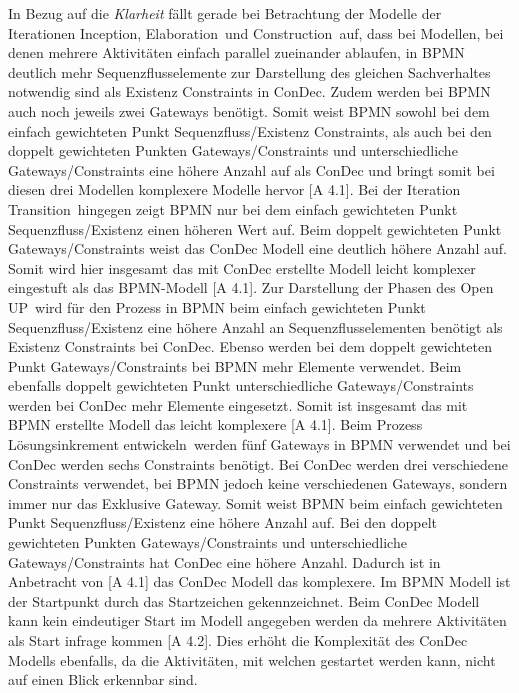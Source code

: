 In Bezug auf die \textit{Klarheit} fällt gerade bei Betrachtung der Modelle der Iterationen \grqq Inception\grqq, \grqq Elaboration\grqq \ und \grqq Construction\grqq \ auf, dass bei Modellen, bei denen mehrere Aktivitäten einfach parallel zueinander ablaufen, in BPMN deutlich mehr Sequenzflusselemente zur Darstellung des gleichen Sachverhaltes notwendig sind als Existenz Constraints in ConDec. Zudem werden bei BPMN auch noch jeweils zwei Gateways benötigt. Somit weist BPMN sowohl bei dem einfach gewichteten Punkt Sequenzfluss/Existenz Constraints, als auch bei den doppelt gewichteten Punkten Gateways/Constraints und unterschiedliche Gateways/Constraints eine höhere Anzahl auf als ConDec und bringt somit bei diesen drei Modellen komplexere Modelle hervor [A 4.1]. \newline
Bei der Iteration \grqq Transition\grqq \ hingegen zeigt BPMN nur bei dem einfach gewichteten Punkt Sequenzfluss/Existenz einen höheren Wert auf. Beim doppelt gewichteten Punkt Gateways/Constraints weist das ConDec Modell eine deutlich höhere Anzahl auf. Somit wird hier insgesamt das mit ConDec erstellte Modell leicht komplexer eingestuft als das BPMN-Modell [A 4.1].\newline
Zur Darstellung der  \grqq Phasen des Open UP\grqq \ wird für den Prozess in BPMN beim einfach gewichteten Punkt Sequenzfluss/Existenz eine höhere Anzahl an Sequenzflusselementen benötigt als Existenz Constraints bei ConDec. Ebenso werden bei dem doppelt gewichteten Punkt Gateways/Constraints bei BPMN mehr Elemente verwendet. Beim ebenfalls doppelt gewichteten Punkt unterschiedliche Gateways/Constraints werden bei ConDec mehr Elemente eingesetzt. Somit ist insgesamt das mit BPMN erstellte Modell das leicht komplexere [A 4.1].  \newline
Beim Prozess \grqq Lösungsinkrement entwickeln\grqq \ werden fünf Gateways in BPMN verwendet und bei ConDec werden sechs Constraints benötigt. Bei ConDec werden drei verschiedene Constraints verwendet, bei BPMN jedoch keine verschiedenen Gateways, sondern immer nur das Exklusive Gateway. Somit weist BPMN beim einfach gewichteten Punkt Sequenzfluss/Existenz eine höhere Anzahl auf. Bei den doppelt gewichteten Punkten Gateways/Constraints und unterschiedliche Gateways/Constraints hat ConDec eine höhere Anzahl. Dadurch ist in Anbetracht von [A 4.1] das ConDec Modell das komplexere.\newline
Im BPMN Modell ist der Startpunkt durch das Startzeichen gekennzeichnet. Beim ConDec Modell kann kein eindeutiger Start im Modell angegeben werden da mehrere Aktivitäten als Start infrage kommen [A 4.2]. Dies erhöht die Komplexität des ConDec Modells ebenfalls, da die Aktivitäten, mit welchen gestartet werden kann, nicht auf einen Blick erkennbar sind. \newline
